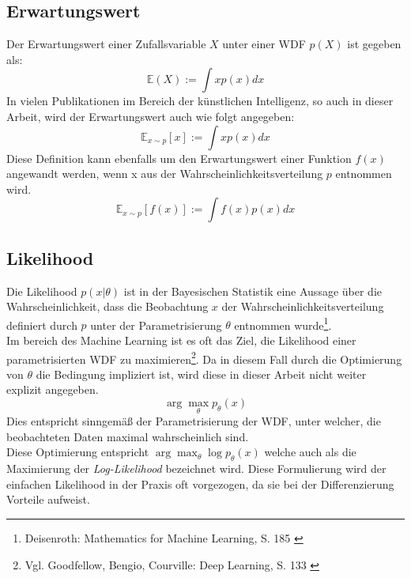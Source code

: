 \subsection{Erwartungswert}

Der Erwartungswert einer Zufallsvariable $X$ unter einer \ac{WDF} $p(X)$ ist gegeben als: 
\begin{equation}
    \mathbb E(X) := \int x p(x) dx
\end{equation}
In vielen Publikationen im Bereich der künstlichen Intelligenz, so auch in dieser Arbeit, wird der Erwartungswert auch wie folgt angegeben:
\begin{equation}
    \mathbb E_{x \sim p}[x] := \int x p(x) dx
\end{equation}
Diese Definition kann ebenfalls um den Erwartungswert einer Funktion $f(x)$ angewandt werden, wenn x aus der Wahrscheinlichkeitsverteilung $p$ entnommen wird. 
\begin{equation}
    \mathbb E_{x \sim p}[f(x)] := \int f(x) p(x) dx
\end{equation}

\subsection{Likelihood}

Die Likelihood $p(x|\theta)$ ist in der Bayesischen Statistik eine Aussage über die Wahrscheinlichkeit, dass die Beobachtung $x$ der Wahrscheinlichkeitsverteilung definiert durch $p$ unter der Parametrisierung $\theta$ entnommen wurde\footnote{
    Deisenroth: Mathematics for Machine Learning, S. 185
    \cite{Deisenroth2020}
}. \\
Im bereich des Machine Learning ist es oft das Ziel, die Likelihood einer parametrisierten \ac{WDF} zu maximieren\footnote{
    Vgl. Goodfellow, Bengio, Courville: Deep Learning, S. 133
    \cite{Goodfellow-et-al-2016}
}. Da in diesem Fall durch die Optimierung von $\theta$ die Bedingung impliziert ist, wird diese in dieser Arbeit nicht weiter explizit angegeben.
\begin{equation}
    \arg\max_\theta p_\theta(x)
\end{equation}
Dies entspricht sinngemäß der Parametrisierung der \ac{WDF}, unter welcher, die beobachteten Daten maximal wahrscheinlich sind. \\
Diese Optimierung entspricht $\arg\max_\theta \log p_\theta(x)$ welche auch als die Maximierung der \textit{Log-Likelihood} bezeichnet wird. Diese Formulierung wird der einfachen Likelihood in der Praxis oft vorgezogen, da sie bei der Differenzierung Vorteile aufweist.

